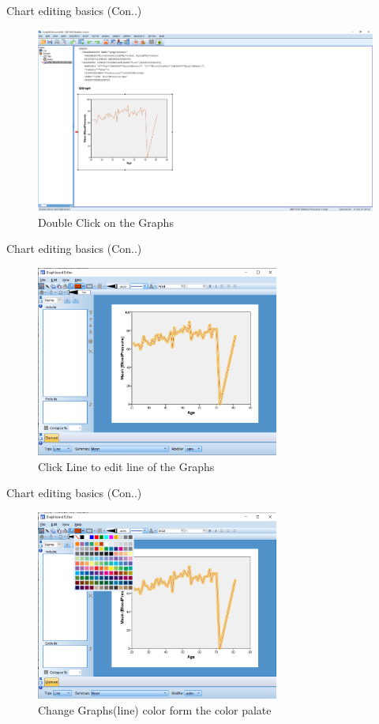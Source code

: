 \begin{frame}[t]{Chart editing basics (Con..)}
	\begin{figure}
		\centering
		\includegraphics[width=12cm]{img/edit_chart-1}
		\caption{Double Click on the Graphs}
	\end{figure}
\end{frame}
\begin{frame}[t]{Chart editing basics (Con..)}
	\begin{figure}
		\centering
		\includegraphics[width=8cm]{img/edit_chart-2}
		\caption{Click Line to edit line of the Graphs}
	\end{figure}
\end{frame}
\begin{frame}[t]{Chart editing basics (Con..)}
	\begin{figure}
		\centering
		\includegraphics[width=8cm]{img/edit_chart-3}
		\caption{Change Graphs(line) color form the color palate}
	\end{figure}
\end{frame}
